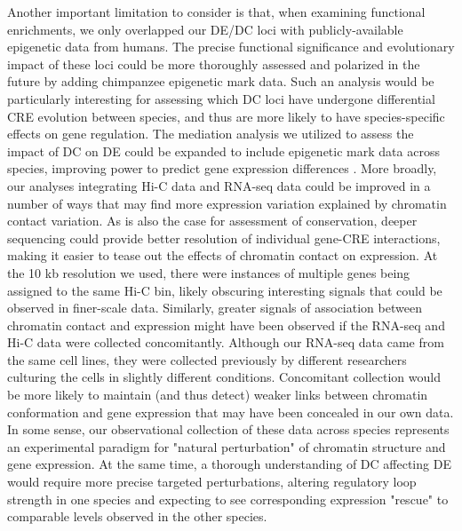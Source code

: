 Another important limitation to consider is that, when examining functional enrichments, we only overlapped our DE/DC loci with publicly-available epigenetic data from humans. The precise functional significance and evolutionary impact of these loci could be more thoroughly assessed and polarized in the future by adding chimpanzee epigenetic mark data. Such an analysis would be particularly interesting for assessing which DC loci have undergone differential CRE evolution between species, and thus are more likely to have species-specific effects on gene regulation. The mediation analysis we utilized to assess the impact of DC on DE could be expanded to include epigenetic mark data across species, improving power to predict gene expression differences \cite{Karlic.2010}. More broadly, our analyses integrating Hi-C data and RNA-seq data could be improved in a number of ways that may find more expression variation explained by chromatin contact variation. As is also the case for assessment of conservation, deeper sequencing could provide better resolution of individual gene-CRE interactions, making it easier to tease out the effects of chromatin contact on expression. At the 10 kb resolution we used, there were instances of multiple genes being assigned to the same Hi-C bin, likely obscuring interesting signals that could be observed in finer-scale data. Similarly, greater signals of association between chromatin contact and expression might have been observed if the RNA-seq and Hi-C data were collected concomitantly. Although our RNA-seq data came from the same cell lines, they were collected previously by different researchers culturing the cells in slightly different conditions. Concomitant collection would be more likely to maintain (and thus detect) weaker links between chromatin conformation and gene expression that may have been concealed in our own data. In some sense, our observational collection of these data across species represents an experimental paradigm for "natural perturbation" of chromatin structure and gene expression. At the same time, a thorough understanding of DC affecting DE would require more precise targeted perturbations, altering regulatory loop strength in one species and expecting to see corresponding expression "rescue" to comparable levels observed in the other species.


